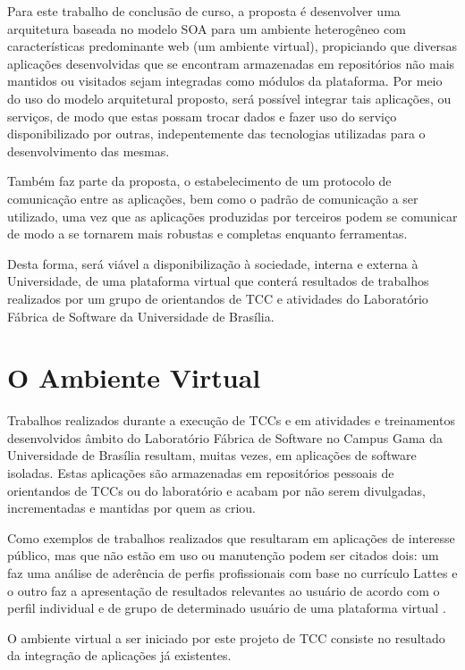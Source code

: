 Para este trabalho de conclusão de curso, a proposta é desenvolver uma arquitetura baseada no modelo SOA para um ambiente heterogêneo com características predominante web (um ambiente virtual), propiciando que diversas aplicações desenvolvidas que se encontram armazenadas em repositórios não mais mantidos ou visitados sejam integradas como módulos da plataforma. Por meio do uso do modelo arquitetural proposto, será possível integrar tais aplicações, ou serviços, de modo que estas possam trocar dados e fazer uso do serviço disponibilizado por outras, indepentemente das tecnologias utilizadas para o desenvolvimento das mesmas.

Também faz parte da proposta, o estabelecimento de um protocolo de comunicação entre as aplicações, bem como o padrão de comunicação a ser utilizado, uma vez que as aplicações produzidas por terceiros podem se comunicar de modo a se tornarem mais robustas e completas enquanto ferramentas.

Desta forma, será viável a disponibilização à sociedade, interna e externa à Universidade, de uma plataforma virtual que conterá resultados de trabalhos realizados por um grupo de orientandos de TCC e atividades do Laboratório Fábrica de Software da Universidade de Brasília.

\section{O Ambiente Virtual}

Trabalhos realizados durante a execução de TCCs e em atividades e treinamentos desenvolvidos âmbito do Laboratório Fábrica de Software no Campus Gama da Universidade de Brasília resultam, muitas vezes, em aplicações de software isoladas. Estas aplicações são armazenadas em repositórios pessoais de orientandos de TCCs ou do laboratório e acabam por não serem divulgadas, incrementadas e mantidas por quem as criou.

Como exemplos de trabalhos realizados que resultaram em aplicações de interesse público, mas que não estão em uso ou manutenção podem ser citados dois: um faz uma análise de aderência de perfis profissionais com base no currículo Lattes \cite{jesus_algoritmo_2014} e o outro faz a apresentação de resultados relevantes ao usuário de acordo com o perfil individual e de grupo de determinado usuário de uma plataforma virtual \cite{carvalho_sistema_2014}.

O ambiente virtual a ser iniciado por este projeto de TCC consiste no resultado da integração de aplicações já existentes.

